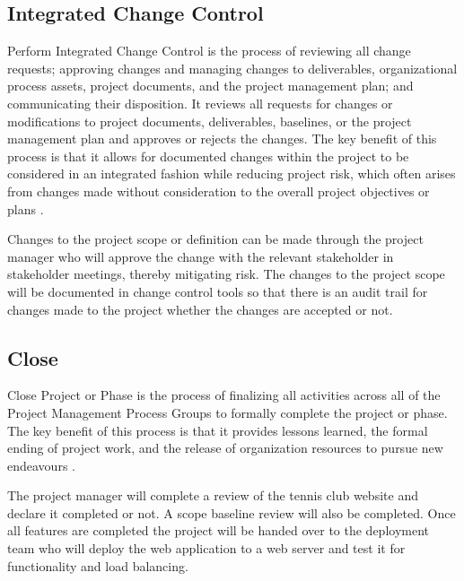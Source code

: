 \subsection{Integrated Change Control}

Perform Integrated Change Control is the process of reviewing all change requests; approving changes and managing changes to deliverables, organizational process assets, project documents, and the project management plan; and communicating their disposition. It reviews all requests for changes or modifications to project documents, deliverables, baselines, or the project management plan and approves or rejects the changes. The key benefit of this process is that it allows for documented changes within the project to be considered in an integrated fashion while reducing project risk, which often arises from changes made without consideration to the overall project objectives or plans \parencite{pmbok}.

Changes to the project scope or definition can be made through the project manager who will approve the change with the relevant stakeholder in stakeholder meetings, thereby mitigating risk. The changes to the project scope will be documented in change control tools so that there is an audit trail for changes made to the project whether the changes are accepted or not.


\subsection{Close}

Close Project or Phase is the process of finalizing all activities across all of the Project Management Process Groups to formally complete the project or phase. The key benefit of this process is that it provides lessons learned, the formal ending of project work, and the release of organization resources to pursue new endeavours \parencite{pmbok}.

The project manager will complete a review of the tennis club website and declare it completed or not. A scope baseline review will also be completed. Once all features are completed the project will be handed over to the deployment team who will deploy the web application to a web server and test it for functionality and load balancing.
